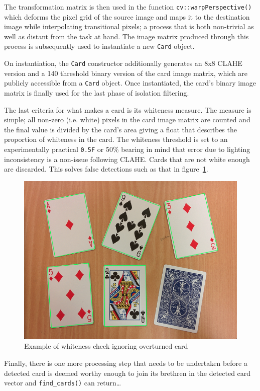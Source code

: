 \documentclass[a4paper,12pt,notitlepage]{article}
\newcommand{\code}[1]{\lstinline[basicstyle=\ttfamily,breakautoindent=false,postbreak={}]|#1|}
\begin{document}
			The transformation matrix is then used in the function \code{cv::warpPerspective()} which deforms the pixel grid of the source image and maps it to the destination image while interpolating transitional pixels; a process that is both non-trivial as well as distant from the task at hand. The image matrix produced through this process is subsequently used to instantiate a new \code{Card} object.

			On instantiation, the \code{Card} constructor additionally generates an 8x8 CLAHE version and a 140 threshold binary version of the card image matrix, which are publicly accessible from a \code{Card} object. Once instantiated, the card's binary image matrix is finally used for the last phase of isolation filtering.

			The last criteria for what makes a card is its whiteness measure. The measure is simple; all non-zero (i.e. white) pixels in the card image matrix are counted and the final value is divided by the card's area giving a float that describes the proportion of whiteness in the card. The whiteness threshold is set to an experimentally practical \code{0.5F} or 50\% bearing in mind that error due to lighting inconsistency is a non-issue following CLAHE. Cards that are not white enough are discarded. This solves false detections such as that in figure~\ref{fig:whiteness}.

			\begin{figure}[H]
				\centering
				\includegraphics[width=0.9\linewidth]{whiteness}
				\caption{Example of whiteness check ignoring overturned card}
				\label{fig:whiteness}
			\end{figure}

			Finally, there is one more processing step that needs to be undertaken before a detected card is deemed worthy enough to join its brethren in the detected card vector and \code{find_cards()} can return\ldots
\end{document}
